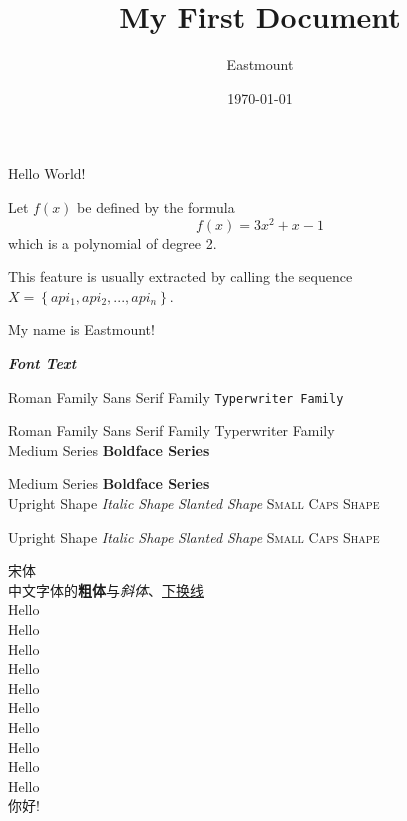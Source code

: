 \documentclass[12pt]{article}
\title{My First Document}
\author{Eastmount}
\date{\today}
\newcommand{\myfont}{\textit{\textbf{\textsf{Font Text}}}}
\begin{document}
	\maketitle
		
	Hello World!
	
	\sffamily
	Let $f(x)$ be defined by the formula $$f(x)=3x^2+x-1$$ which is a polynomial of degree 2.
	
	{\ttfamily
	This feature is usually extracted by calling the sequence $X=\left\{ {api_1,api_2,...,api_n} \right\}$.}

	My name is Eastmount!
	
	\myfont
	
	
	\textrm{Roman Family} \textsf{Sans Serif Family} \texttt{Typerwriter Family}
	
	\rmfamily Roman Family {\sffamily Sans Serif Family} {\ttfamily Typerwriter Family}\\
	
	\textmd{Medium Series} \textbf{Boldface Series}
	
	{\mdseries Medium Series} {\bfseries Boldface Series}\\
	
	\textup{Upright Shape} \textit{Italic Shape}
	\textsl{Slanted Shape} \textsc{Small Caps Shape}
	
	{\upshape Upright Shape} {\itshape Italic Shape}
	{\slshape Slanted Shape} {\scshape Small Caps Shape}
	
	{\songti 宋体}   \\
	
	中文字体的\textbf{粗体}与\textit{斜体}、\underline{下换线}\\
	
	{\tiny			Hello}\\
	{\scriptsize	Hello}\\
	{\footnotesize	Hello}\\
	{\small			Hello}\\
	{\normalsize	Hello}\\
	{\large			Hello}\\
	{\Large			Hello}\\
	{\LARGE			Hello}\\
	{\huge			Hello}\\
	{\Huge			Hello}\\
	
	 你好!
	
	
\end{document}
